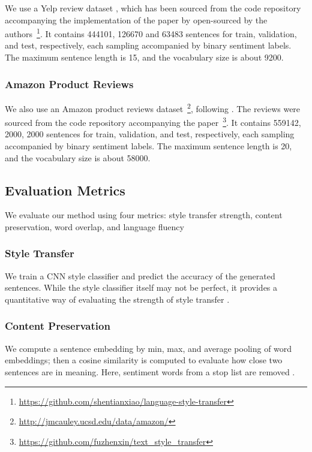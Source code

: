 \documentclass[11pt,a4paper]{article}
\begin{document}
We use a Yelp review dataset \citep{challenge2013yelp}, which has been sourced from the code repository accompanying the implementation of the paper by \citet{shen2017style} open-sourced by the authors~\footnote{\url{https://github.com/shentianxiao/language-style-transfer}}. It contains 444101, 126670 and 63483 sentences for train, validation, and test, respectively, each sampling accompanied by binary sentiment labels. The maximum sentence length is 15, and the vocabulary size is about 9200.

\subsubsection{Amazon Product Reviews}

We also use an Amazon product reviews dataset~\footnote{\url{http://jmcauley.ucsd.edu/data/amazon/}}, following \citet{fu2017style}. The reviews were sourced from the code repository accompanying the paper~\footnote{\url{https://github.com/fuzhenxin/text_style_transfer}}. It contains 559142, 2000, 2000 sentences for train, validation, and test, respectively, each sampling accompanied by binary sentiment labels. The maximum sentence length is 20, and the vocabulary size is about 58000.

\subsection{Evaluation Metrics}

We evaluate our method using four metrics: style transfer strength, content preservation, word overlap, and language fluency

\subsubsection{Style Transfer}
We train a CNN style classifier \cite{kim2014convolutional} and predict the accuracy of the generated sentences. While the style classifier itself may not be perfect, it provides a quantitative way of evaluating the strength of style transfer \cite{hu2017toward,shen2017style,fu2017style}.

\subsubsection{Content Preservation}
We compute a sentence embedding by min, max, and average pooling of word embeddings; then a cosine similarity is computed to evaluate how close two sentences are in meaning. Here, sentiment words from a stop list \cite{hu2004mining} are removed \cite{fu2017style}.
\end{document}

